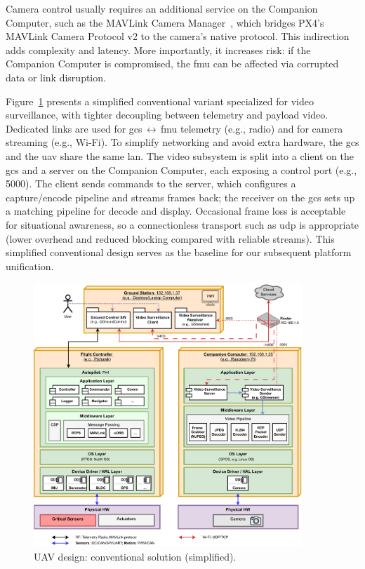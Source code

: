 Camera control usually requires an additional service on the Companion Computer,
such as the MAVLink Camera Manager~\cite{px4-cam-managers}, which bridges PX4’s
MAVLink Camera Protocol v2 to the camera’s native protocol. This indirection
adds complexity and latency. More importantly, it increases risk: if the
Companion Computer is compromised, the \gls{fmu} can be affected via corrupted
data or link disruption.

Figure~\ref{fig:uav-design-conv-sol-2} presents a simplified conventional
variant specialized for video surveillance, with tighter decoupling between
telemetry and payload video.
%
Dedicated links are used for \gls{gcs}\,$\leftrightarrow$\,\gls{fmu} telemetry
(e.g., radio) and for camera streaming (e.g., Wi-Fi). To simplify networking and
avoid extra hardware, the \gls{gcs} and the \gls{uav} share the same \gls{lan}.
The video subsystem is split into a client on the \gls{gcs} and a server on the
Companion Computer, each exposing a control port (e.g., 5000). The client sends
commands to the server, which configures a capture/encode pipeline and streams
frames back; the receiver on the \gls{gcs} sets up a matching pipeline for
decode and display. Occasional frame loss is acceptable for situational
awareness, so a connectionless transport such as \gls{udp} is appropriate
(lower overhead and reduced blocking compared with reliable
streams). This simplified conventional design serves as the baseline for our
subsequent platform unification.

\begin{figure}[!hbt]
  \centering
  \includegraphics[width=0.9\textwidth]{./img/pdf/uav-main-design-conv-sol-2.pdf}
  \caption{UAV design: conventional solution (simplified).}
  \label{fig:uav-design-conv-sol-2}
\end{figure}


